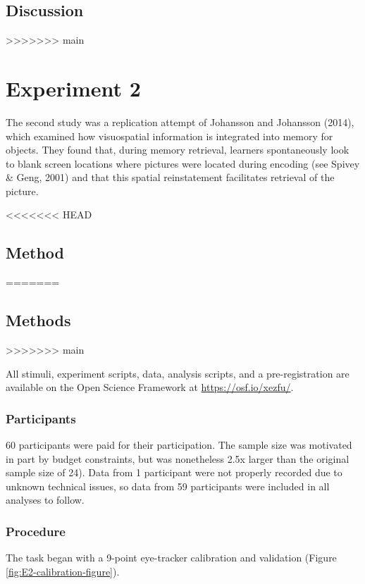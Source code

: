\documentclass[
  man,floatsintext]{apa6}
\begin{document}
\subsection{Discussion}\label{discussion}

>>>>>>> main
\section{Experiment 2}\label{experiment-2}

The second study was a replication attempt of Johansson and Johansson (2014),
which examined how visuospatial information is integrated into memory
for objects. They found that, during memory retrieval, learners
spontaneously look to blank screen locations where pictures were located
during encoding (see Spivey \& Geng, 2001) and that
this spatial reinstatement facilitates retrieval of the picture.

<<<<<<< HEAD
\subsection{Method}\label{method-1}
=======
\subsection{Methods}\label{methods-1}
>>>>>>> main

All stimuli, experiment scripts, data, analysis scripts, and a
pre-registration are available on the Open Science Framework at
\url{https://osf.io/xezfu/}.

\subsubsection{Participants}\label{participants-2}

60 participants were paid for their participation.
The sample size was motivated in part by budget constraints, but was
nonetheless 2.5x larger than the original sample size of 24).
Data from 1 participant were not properly
recorded due to unknown technical issues, so data from 59 participants
were included in all analyses to follow.

\subsubsection{Procedure}\label{procedure-1}

The task began with a 9-point eye-tracker calibration
and validation (Figure \ref{fig:E2-calibration-figure}).
\end{document}
